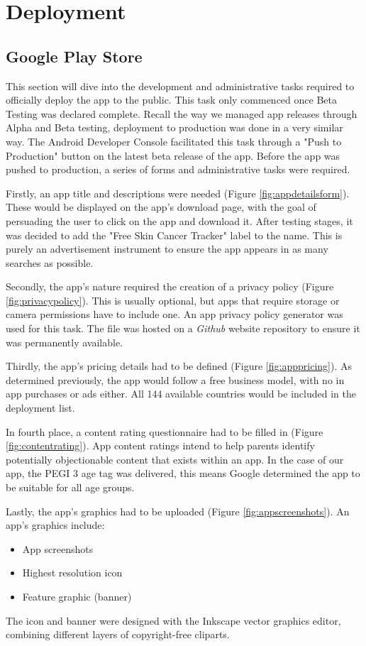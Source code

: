 \chapter{Deployment}
\section{Google Play Store}
This section will dive into the development and administrative tasks required to officially deploy the app to the public. This task only commenced once Beta Testing was declared complete. Recall the way we managed app releases through Alpha and Beta testing, deployment to production was done in a very similar way. The Android Developer Console facilitated this task through a "Push to Production" button on the latest beta release of the app.
Before the app was pushed to production, a series of forms and administrative tasks were required. 

Firstly, an app title and descriptions were needed (Figure \ref{fig:appdetailsform}). These would be displayed on the app's download page, with the goal of persuading the user to click on the app and download it. After testing stages, it was decided to add the "Free Skin Cancer Tracker" label to the name. This is purely an advertisement instrument to ensure the app appears in as many searches as possible.

Secondly, the app's nature required the creation of a privacy policy (Figure \ref{fig:privacypolicy}). This is usually optional, but apps that require storage or camera permissions have to include one. An app privacy policy generator \cite{nishantsrivastava} was used for this task. The file was hosted on a \emph{Github} website repository to ensure it was permanently available.

Thirdly, the app's pricing details had to be defined (Figure \ref{fig:apppricing}). As determined previously, the app would follow a free business model, with no in app purchases or ads either. All 144 available countries would be included in the deployment list.

In fourth place, a content rating questionnaire had to be filled in (Figure \ref{fig:contentrating}). App content ratings intend to help parents identify potentially objectionable content that exists within an app. In the case of our app, the PEGI 3 age tag was delivered, this means Google determined the app to be suitable for all age groups.

Lastly, the app's graphics had to be uploaded (Figure \ref{fig:appscreenshots}). An app's graphics include:
\begin{itemize}
    \item App screenshots
    \item Highest resolution icon
    \item Feature graphic (banner)
\end{itemize}
The icon and banner were designed with the Inkscape vector graphics editor, combining different layers of copyright-free cliparts.

